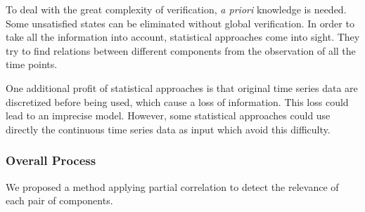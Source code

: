 To deal with the great complexity of verification, \textit{a priori} knowledge is needed. 
Some unsatisfied states can be eliminated without global verification.  
In order to take all the information into account, statistical approaches come into sight.
They try to find relations between different components from the observation of all the time points.

One additional profit of statistical approaches is that original time series data are discretized before being used, which cause a loss of information.
This loss could lead to an imprecise model.
However, some statistical approaches could use directly the continuous time series data as input which avoid this difficulty.

\subsubsection{Overall Process}
We proposed a method applying partial correlation to detect the relevance of each pair of components.

